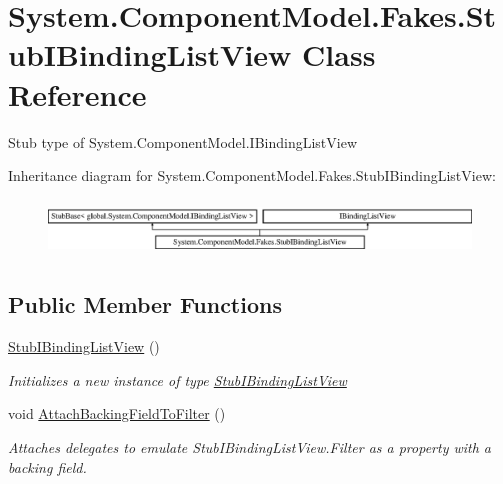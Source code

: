 \hypertarget{class_system_1_1_component_model_1_1_fakes_1_1_stub_i_binding_list_view}{\section{System.\-Component\-Model.\-Fakes.\-Stub\-I\-Binding\-List\-View Class Reference}
\label{class_system_1_1_component_model_1_1_fakes_1_1_stub_i_binding_list_view}
}


Stub type of System.\-Component\-Model.\-I\-Binding\-List\-View 


Inheritance diagram for System.\-Component\-Model.\-Fakes.\-Stub\-I\-Binding\-List\-View\-:\begin{figure}[H]
\begin{center}
\leavevmode
\includegraphics[height=1.501341cm]{class_system_1_1_component_model_1_1_fakes_1_1_stub_i_binding_list_view}
\end{center}
\end{figure}
\subsection*{Public Member Functions}
\begin{DoxyCompactItemize}
\item 
\hyperlink{class_system_1_1_component_model_1_1_fakes_1_1_stub_i_binding_list_view_a8646cf54dcf742e953e724bb8a0919b4}{Stub\-I\-Binding\-List\-View} ()
\begin{DoxyCompactList}\small\item\em Initializes a new instance of type \hyperlink{class_system_1_1_component_model_1_1_fakes_1_1_stub_i_binding_list_view}{Stub\-I\-Binding\-List\-View}\end{DoxyCompactList}\item 
void \hyperlink{class_system_1_1_component_model_1_1_fakes_1_1_stub_i_binding_list_view_a370bd21330631d122d22414386533361}{Attach\-Backing\-Field\-To\-Filter} ()
\begin{DoxyCompactList}\small\item\em Attaches delegates to emulate Stub\-I\-Binding\-List\-View.\-Filter as a property with a backing field.\end{DoxyCompactList}\end{DoxyCompactItemize}
